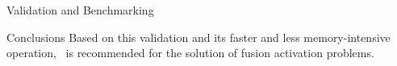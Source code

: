 \begin{chapter}{Validation and Benchmarking}
\begin{section}{Conclusions}
    Based on this validation and its faster and less memory-intensive
    operation, \ALARA\ is recommended for the solution of fusion
    activation problems.
    
  \end{section}

\end{chapter}